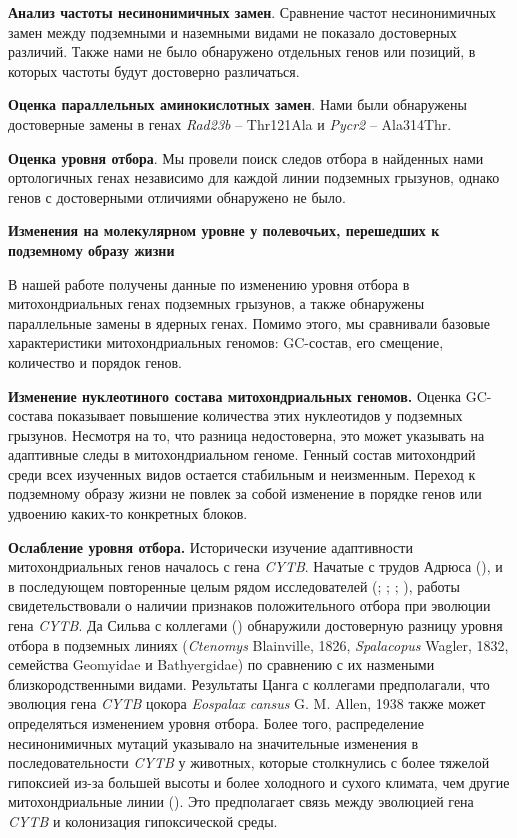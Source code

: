 \textbf{Анализ частоты несинонимичных замен}. Сравнение частот несинонимичных замен между подземными и наземными видами не показало достоверных различий. Также нами не было обнаружено отдельных генов  или позиций, в которых частоты будут достоверно различаться. 

\textbf{Оценка параллельных аминокислотных замен}. Нами были обнаружены достоверные замены в генах \textit{Rad23b} -- Thr121Ala и \textit{Pycr2} -- Ala314Thr.

\textbf{Оценка уровня отбора}. Мы провели поиск следов отбора в найденных нами ортологичных генах независимо для каждой линии подземных грызунов, однако генов с достоверными отличиями обнаружено не было.

\vspace{3mm}

\hspace{-10mm}\textbf{\Large Изменения на молекулярном уровне у полевочьих, перешедших к подземному образу жизни}

\vspace{3mm}

В нашей работе получены данные по изменению уровня отбора в митохондриальных генах подземных грызунов, а также обнаружены параллельные замены в ядерных генах. Помимо этого, мы сравнивали базовые характеристики митохондриальных геномов: GC-состав, его смещение, количество и порядок генов. 

\textbf{Изменение нуклеотиного состава митохондриальных геномов.} Оценка GC-состава показывает повышение количества этих нуклеотидов у подземных грызунов. Несмотря на то, что разница недостоверна, это может указывать на адаптивные следы в митохондриальном геноме. Генный состав митохондрий среди всех изученных видов остается стабильным и неизменным. Переход к подземному образу жизни не повлек за собой изменение в порядке генов или удвоению каких-то конкретных блоков.


\textbf{Ослабление уровня отбора.} Исторически изучение адаптивности митохондриальных генов началось с гена \textit{CYTB}. Начатые с трудов Адрюса (\cite{Andrews1998}), и в последующем повторенные целым рядом исследователей (\cite{Tomasco2014}; \cite{DaSilva2009}; \cite{DiRocco2006}; \cite{Shao2015}), работы свидетельствовали о наличии признаков положительного отбора при эволюции гена \textit{CYTB}. Да Сильва с коллегами (\cite{DaSilva2009}) обнаружили достоверную разницу уровня отбора в подземных линиях (\textit{Ctenomys} Blainville, 1826, \textit{Spalacopus} Wagler, 1832, семейства Geomyidae и Bathyergidae) по сравнению с их назмеными близкородственными видами. Результаты Цанга с коллегами предполагали, что эволюция гена \textit{CYTB} цокора \textit{Eospalax cansus} G. M. Allen, 1938 также может определяться изменением уровня отбора. Более того, распределение несинонимичных мутаций указывало на значительные изменения в последовательности \textit{CYTB} у животных, которые столкнулись с более тяжелой гипоксией из-за большей высоты и более холодного и сухого климата, чем другие митохондриальные линии (\cite{Zhang2013a}). Это предполагает связь между эволюцией гена \textit{CYTB} и колонизация гипоксической среды. 

